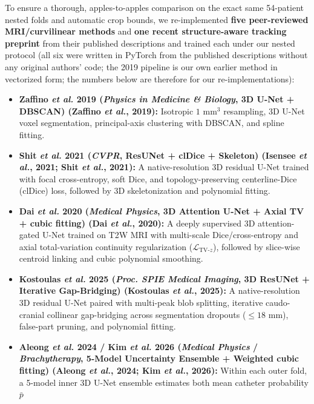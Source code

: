 \documentclass[
  11pt,
]{article}
\providecommand{\tightlist}{%
  \setlength{\itemsep}{0pt}\setlength{\parskip}{0pt}}
\begin{document}
To ensure a thorough, apples-to-apples comparison on the exact same
54-patient nested folds and automatic crop bounds, we re-implemented
\textbf{five peer-reviewed MRI/curvilinear methods} and \textbf{one
recent structure-aware tracking preprint} from their published
descriptions and trained each under our nested protocol (all six were
written in PyTorch from the published descriptions without any original
authors' code; the 2019 pipeline is our own earlier method in vectorized
form; the numbers below are therefore for our re-implementations):

\begin{itemize}
\tightlist
\item
  \textbf{Zaffino \emph{et al.} 2019 (\emph{Physics in Medicine \&
  Biology}, 3D U-Net + DBSCAN) (Zaffino \emph{et al.}, 2019):} Isotropic
  \(1\text{ mm}^3\) resampling, 3D U-Net voxel segmentation,
  principal-axis clustering with DBSCAN, and spline fitting.
\item
  \textbf{Shit \emph{et al.} 2021 (\emph{CVPR}, ResUNet + clDice +
  Skeleton) (Isensee \emph{et al.}, 2021; Shit \emph{et al.}, 2021):} A
  native-resolution 3D residual U-Net trained with focal cross-entropy,
  soft Dice, and topology-preserving centerline-Dice (clDice) loss,
  followed by 3D skeletonization and polynomial fitting.
\item
  \textbf{Dai \emph{et al.} 2020 (\emph{Medical Physics}, 3D Attention
  U-Net + Axial TV + cubic fitting) (Dai \emph{et al.}, 2020):} A deeply
  supervised 3D attention-gated U-Net trained on T2W MRI with
  multi-scale Dice/cross-entropy and axial total-variation continuity
  regularization (\(\mathcal{L}_{\text{TV-}z}\)), followed by slice-wise
  centroid linking and cubic polynomial smoothing.
\item
  \textbf{Kostoulas \emph{et al.} 2025 (\emph{Proc. SPIE Medical
  Imaging}, 3D ResUNet + Iterative Gap-Bridging) (Kostoulas \emph{et
  al.}, 2025):} A native-resolution 3D residual U-Net paired with
  multi-peak blob splitting, iterative caudo-cranial collinear
  gap-bridging across segmentation dropouts (\(\le 18\text{ mm}\)),
  false-part pruning, and polynomial fitting.
\item
  \textbf{Aleong \emph{et al.} 2024 / Kim \emph{et al.} 2026
  (\emph{Medical Physics} / \emph{Brachytherapy}, 5-Model Uncertainty
  Ensemble + Weighted cubic fitting) (Aleong \emph{et al.}, 2024; Kim
  \emph{et al.}, 2026):} Within each outer fold, a 5-model inner 3D
  U-Net ensemble estimates both mean catheter probability \(\bar{p}\)

\end{itemize}
\end{document}
